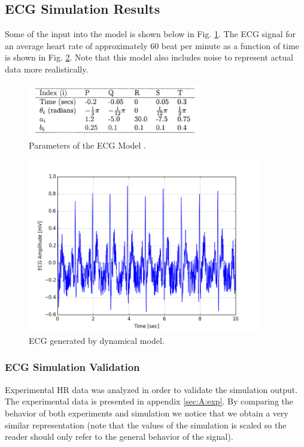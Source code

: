 \documentclass[paper=a4, fontsize=11pt]{scrartcl}
\numberwithin{equation}{section}		%
\numberwithin{figure}{section}			%
\numberwithin{table}{section}		    %
\begin{document}
\subsection{ECG Simulation Results}
Some of the input into the model is shown below in Fig. \ref{fig:ecg_params}. The ECG signal for an
average heart rate of approximately 60 beat per minute as a function of time is shown in Fig.  
\ref{fig:sim_ecg}. Note that this model also includes noise to represent actual data more 
realistically. 

\begin{figure}[H]
	\begin{center} 
		\includegraphics[height=.91in,width=3in]{ecg_params} 
		\caption{Parameters of the ECG Model \cite{mcsharry2003dynamical}. \label{fig:ecg_params}} 
	\end{center} 
\end{figure}

\begin{figure}[H]
	\begin{center} 
		\includegraphics[height=3in,width=4in]{sim_ecg} 
		\caption{ECG generated by dynamical model. \label{fig:sim_ecg}} 
	\end{center} 
\end{figure}

\subsubsection{ECG Simulation Validation}
Experimental HR data was analyzed in order to validate the simulation output. The experimental
data is presented in appendix \ref{sec:A:exp}. By comparing the behavior of both experiments 
and simulation we notice that we obtain a very similar representation (note that the values of 
the simulation is scaled so the reader should only refer to the general behavior of the signal).
  
\end{document}
